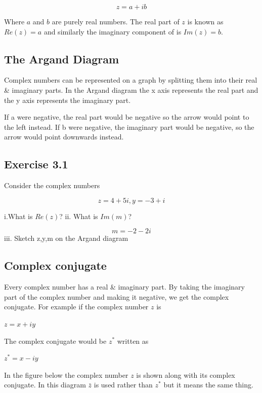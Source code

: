 \documentclass{book}
\begin{document}
$$ z = a + ib $$

Where $a$ and $b$ are purely real numbers. The real part of $z$ is known as $ Re(z) = a$ and similarly the imaginary component of is $ Im(z) = b$. 

\subsection{ The Argand Diagram}

Complex numbers can be represented on a graph by splitting them into their real \& imaginary parts. In the Argand diagram the x axis represents the real part and the y axis represents the imaginary part. 

If a were negative, the real part would be negative so the arrow would point to the left instead. If b were negative, the imaginary part would be negative, so the arrow would point downwards instead. 


\subsection{Exercise 3.1}

Consider the complex numbers 

$$ z = 4 + 5i , y = -3 + i $$

i.What is $Re(z)$? 
ii. What is $Im(m)$? 

$$m = -2 - 2i $$ 
iii. Sketch z,y,m on the Argand diagram 


\subsection{ Complex conjugate}

Every complex number has a real \& imaginary part. By taking the imaginary part of the complex number and making it negative, we get the complex conjugate. For example if the complex number $z$ is 

$z = x + iy$ 

The complex conjugate would be $z^*$ written as 

$z^* = x - iy$ 

In the figure below the complex number $z$ is shown along with its complex conjugate. In this diagram $\bar{z}$ is used rather than $z^*$ but it means the same thing.  
\end{document}
